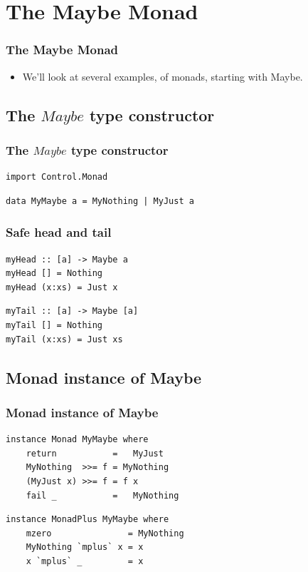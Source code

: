 \documentclass{beamer}
\begin{document}
\section{The Maybe Monad}
\begin{frame}[fragile]
\frametitle{The Maybe Monad}

\begin{itemize}
\item We'll look at several examples, of monads, starting with Maybe.
\end{itemize}

\end{frame}

\subsection{The $Maybe$ type constructor}
\begin{frame}[fragile]
\frametitle{The $Maybe$ type constructor}

\begin{verbatim}
import Control.Monad
\end{verbatim}

\begin{verbatim}
data MyMaybe a = MyNothing | MyJust a
\end{verbatim}

\end{frame}

\begin{frame}[fragile]
\frametitle{Safe head and tail}

\begin{verbatim}
myHead :: [a] -> Maybe a
myHead [] = Nothing
myHead (x:xs) = Just x
\end{verbatim}

\begin{verbatim}
myTail :: [a] -> Maybe [a]
myTail [] = Nothing
myTail (x:xs) = Just xs
\end{verbatim}

\end{frame}

\subsection{Monad instance of Maybe}
\begin{frame}[fragile]
\frametitle{Monad instance of Maybe}

\begin{verbatim}
instance Monad MyMaybe where
    return           =   MyJust
    MyNothing  >>= f = MyNothing
    (MyJust x) >>= f = f x
    fail _           =   MyNothing
\end{verbatim}

    
\begin{verbatim}
instance MonadPlus MyMaybe where
    mzero               = MyNothing
    MyNothing `mplus` x = x
    x `mplus` _         = x
\end{verbatim}

\end{frame}
\end{document}
